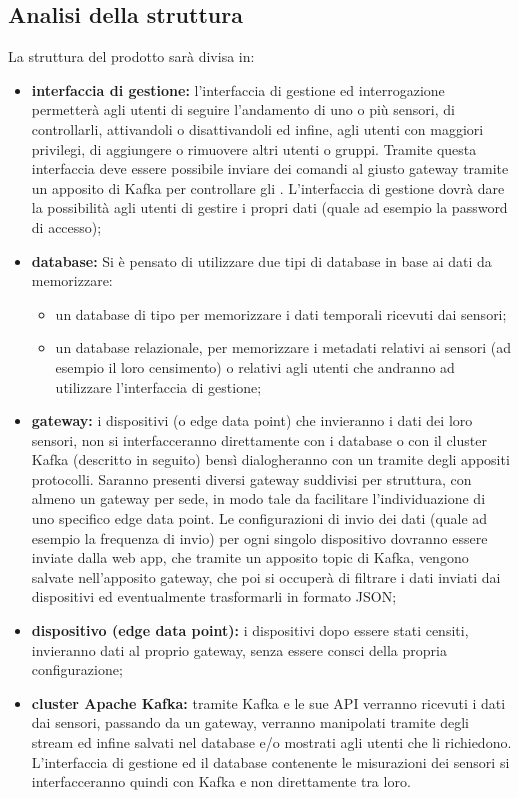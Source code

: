 	\subsection{Analisi della struttura}
		La struttura del prodotto sarà divisa in:
		\begin{itemize}
			\item \textbf{interfaccia di gestione:} l'interfaccia di gestione ed interrogazione permetterà agli utenti di seguire l'andamento di uno o più sensori, di controllarli, attivandoli o disattivandoli ed infine, agli utenti con maggiori privilegi, di aggiungere o rimuovere altri utenti o gruppi.
			Tramite questa interfaccia deve essere possibile inviare dei comandi al giusto gateway tramite un apposito  di Kafka per controllare gli . 
			L'interfaccia di gestione dovrà dare la possibilità agli utenti di gestire i propri dati (quale ad esempio la password di accesso);
			\item \textbf{database:} Si è pensato di utilizzare due tipi di database in base ai dati da memorizzare:
			\begin{itemize}
				\item un database di tipo  per memorizzare i dati temporali ricevuti dai sensori;
				\item un database relazionale, per memorizzare i metadati relativi ai sensori (ad esempio il loro censimento) o relativi agli utenti che andranno ad utilizzare l'interfaccia di gestione;
			\end{itemize}

			\item \textbf{gateway:} i dispositivi (o edge data point) che invieranno i dati dei loro sensori, non si interfacceranno direttamente con i database o con il cluster Kafka (descritto in seguito) bensì dialogheranno con un  tramite degli appositi protocolli.
			Saranno presenti diversi gateway suddivisi per struttura, con almeno un gateway per sede, in modo tale da facilitare l'individuazione di uno specifico edge data point.
			Le configurazioni di invio dei dati (quale ad esempio la frequenza di invio) per ogni singolo dispositivo dovranno essere inviate dalla web app, che tramite un apposito topic di Kafka, vengono salvate nell'apposito gateway, che poi si occuperà di filtrare i dati inviati dai dispositivi ed eventualmente trasformarli in formato JSON;

			\item \textbf{dispositivo (edge data point):} i dispositivi dopo essere stati censiti, invieranno dati al proprio gateway, senza essere consci della propria configurazione;

			\item \textbf{cluster Apache Kafka:} tramite Kafka e le sue API verranno ricevuti i dati dai sensori, passando da un gateway, verranno manipolati tramite degli stream ed infine salvati nel database e/o mostrati agli utenti che li richiedono. L'interfaccia di gestione ed il database contenente le misurazioni dei sensori si interfacceranno quindi con Kafka e non direttamente tra loro.

		\end{itemize}
